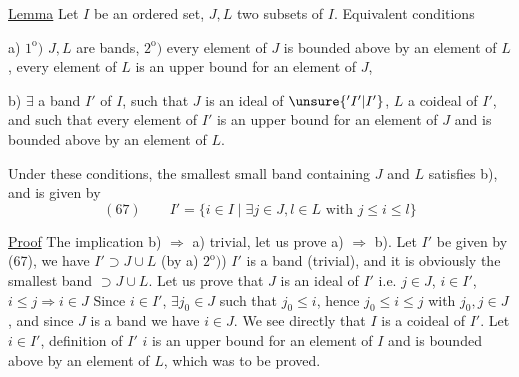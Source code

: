 
\uline{Lemma} Let $I$ be an ordered set, $J,L$ two subsets of $I$. Equivalent conditions

a) $1^{\mathrm o})$ $J,L$ are bands, $2^{\mathrm o})$ every element of $J$ is bounded above by an element of $L$, every element of $L$ is an upper bound for an element of $J$, 

b) $\exists$ a band $I'$ of $I$, such that $J$ is an ideal of $\unsure{{}'I'|I'}$, $L$ a coideal of $I'$, and such that every element of $I'$ is an upper bound for an element of $J$ and is bounded above by an element of $L$.

Under these conditions,    the smallest small band  containing $J$ and $L$ satisfies b), and is given by
\[
(67)\qquad I'=\{i\in I\mid\exists j\in J,l\in L\text{ with }j\leq i\leq l\}
\]

\uline{Proof} The implication b) $\Rightarrow$ a) trivial,  let us prove a) $\Rightarrow$ b). Let $I'$ be given by (67), we have $I'\supset J\cup L$ (by a) $2^{\mathrm o})$) $I'$ is a band (trivial), and it is obviously the smallest band $\supset J\cup L$. Let us prove that $J$ is an ideal of $I'$ i.e. $j\in J$, $i\in I'$, $i\leq j\Rightarrow i\in J$ Since $i\in I'$, $\exists j_0\in J$ such that $j_0\leq i$, hence $j_0\leq i\leq j$ with $j_0,j\in J$, and since $J$ is a band  we have $i\in J$. We see directly that $I$ is a coideal of $I'$. Let $i\in I'$,   definition of $I'$ $i$ is an upper bound for an element of $I$ and is bounded above by an element of $L$, which was to be proved.
